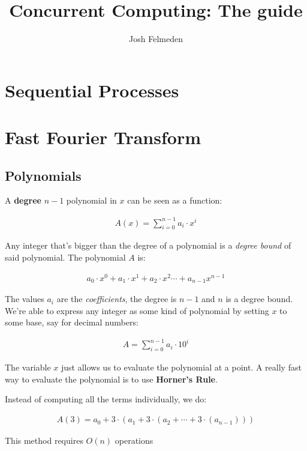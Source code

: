 \documentclass[11pt,a4paper,titlepage,dvipsnames,cmyk]{scrartcl}
\title{Concurrent Computing: The guide}
\author{Josh Felmeden}
\begin{document}
\maketitle
\tableofcontents

\newpage
\section{Sequential Processes}%
\label{sec:sequential-processes}

\section{Fast Fourier Transform}%
\label{sec:fft}

\subsection{Polynomials}%
\label{sub:Polynomials}
A \textbf{degree} $n-1$ polynomial in $x$ can be seen as a function:

\begin{align*}
    A(x) = \sum^{n-1}_{i=0}a_i \cdot x^i
\end{align*}

Any integer that's bigger than the degree of a polynomial is a
\textit{degree bound} of said polynomial. The polynomial $A$ is:

\begin{align*}
    a_0 \cdot x^0 + a_1 \cdot x^1 + a_2 \cdot x^2 \cdots + a_{n-1}x^{n-1}
\end{align*}

The values $a_i$ are the \textit{coefficients}, the degree is $n-1$ and
$n$ is a degree bound. We're able to express any integer as some kind of
polynomial by setting $x$ to some base, say for decimal numbers:

\begin{align*}
    A = \sum^{n-1}_{i=0} a_i \cdot 10^i
\end{align*}

The variable $x$ just allows us to evaluate the polynomial at a point. A
really fast way to evaluate the polynomial is to use \textbf{Horner's
Rule}.

\begin{tcolorbox} [space to upper,
        collower=white,
        title={Horner's Rule},
        nobeforeafter,
        halign lower=flush right, ]
Instead of computing all the terms individually, we do:

\begin{align*}
    A(3) = a_0 + 3 \cdot (a_1 + 3\cdot (a_2 + \cdots + 3\cdot (a_{n-1})))
\end{align*}

This method requires $O(n)$ operations

\end{tcolorbox}
\end{document}
